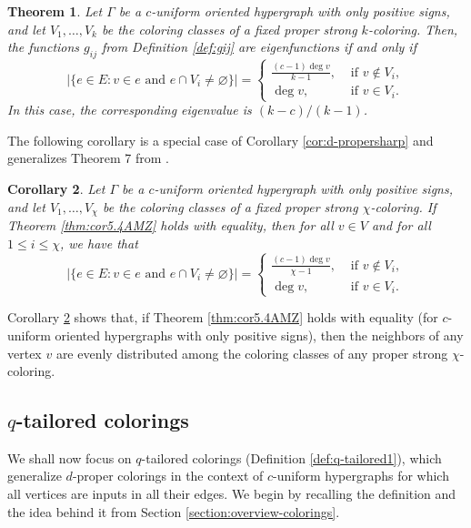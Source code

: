 \documentclass{article}
\theoremstyle{plain}
\newtheorem{theorem}{Theorem}[section]
\newtheorem{corollary}[theorem]{Corollary}
\theoremstyle{definition}
\theoremstyle{remark}
\begin{document}
\begin{theorem}\label{thm:uniformstrong}
    Let $\Gamma$ be a $c$-uniform oriented hypergraph with only positive signs, and let $V_1,\ldots,V_k$ be the coloring classes of a fixed proper strong $k$-coloring. Then, the functions $g_{ij}$ from Definition \ref{def:gij} are eigenfunctions if and only if
    \[
    \bigl| \{e\in E \colon v\in e \text{ and } e\cap V_i \neq \varnothing\}\bigr| = \begin{cases}
        \frac{(c-1) \deg v}{k -1}, &\text{ if } v\notin V_i,\\
        \deg v, &\text{ if } v\in V_i.
    \end{cases}
    \]
    In this case, the corresponding eigenvalue is $(k-c)/(k-1)$.
\end{theorem}
The following corollary is a special case of Corollary \ref{cor:d-propersharp} and generalizes Theorem 7 from \cite{Gabriel-colouring}. 
\begin{corollary}\label{cor:equality}
     Let $\Gamma$ be a $c$-uniform oriented hypergraph with only positive signs, and let $V_1,\ldots,V_\chi$ be the coloring classes of a fixed proper strong $\chi$-coloring. If Theorem \ref{thm:cor5.4AMZ} holds with equality, then for all $v\in V$ and for all $1\leq i\leq \chi$, we have that
    \[
    \bigl| \{e\in E \colon v\in e \text{ and } e\cap V_i \neq \varnothing\}\bigr| = \begin{cases}
        \frac{(c-1) \deg v}{\chi -1}, &\text{ if } v\notin V_i,\\
        \deg v, &\text{ if } v\in V_i.
    \end{cases}
    \]
\end{corollary}
Corollary \ref{cor:equality} shows that, if Theorem \ref{thm:cor5.4AMZ} holds with equality (for $c$-uniform oriented hypergraphs with only positive signs), then the neighbors of any vertex $v$ are evenly distributed among the coloring classes of any proper strong $\chi$-coloring.

\subsection{\texorpdfstring{$q$}{q}-tailored colorings}\label{subsec:q-tailored}

We shall now focus on $q$-tailored colorings (Definition \ref{def:q-tailored1}), which generalize $d$-proper colorings in the context of $c$-uniform hypergraphs for which all vertices are inputs in all their edges. We begin by recalling the definition and the idea behind it from Section \ref{section:overview-colorings}.\newline 
\end{document}
